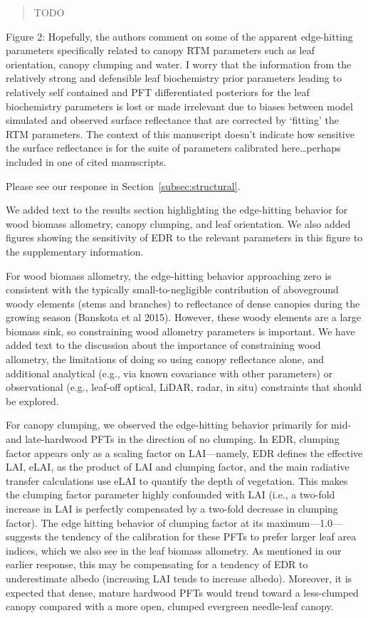 \begin{quote}
TODO
\end{quote}

\begin{reviewer}
  Figure 2: Hopefully, the authors comment on some of the apparent edge-hitting parameters specifically related to canopy RTM parameters such as leaf orientation, canopy clumping and water.
  I worry that the information from the relatively strong and defensible leaf biochemistry prior parameters leading to relatively self contained and PFT differentiated posteriors for the leaf biochemistry parameters is lost or made irrelevant due to biases between model simulated and observed surface reflectance that are corrected by ‘fitting’ the RTM parameters.
  The context of this manuscript doesn’t indicate how sensitive the surface reflectance is for the suite of parameters calibrated here\ldots perhaps included in one of cited manuscripts.
\end{reviewer}

Please see our response in Section~\ref{subsec:structural}.

We added text to the results section highlighting the edge-hitting behavior for wood biomass allometry, canopy clumping, and leaf orientation. We also added figures showing the sensitivity of EDR to the relevant parameters in this figure to the supplementary information.

For wood biomass allometry, the edge-hitting behavior approaching zero is consistent with the typically small-to-negligible contribution of aboveground woody elements (stems and branches) to reflectance of dense canopies during the growing season (Banskota et al 2015). However, these woody elements are a large biomass sink, so constraining wood allometry parameters is important. We have added text to the discussion about the importance of constraining wood allometry, the limitations of doing so using canopy reflectance alone, and additional analytical (e.g., via known covariance with other parameters) or observational (e.g., leaf-off optical, LiDAR, radar, in situ) constraints that should be explored.

For canopy clumping, we observed the edge-hitting behavior primarily for mid- and late-hardwood PFTs in the direction of no clumping. In EDR, clumping factor appears only as a scaling factor on LAI---namely, EDR defines the effective LAI, eLAI, as the product of LAI and clumping factor, and the main radiative transfer calculations use eLAI to quantify the depth of vegetation. This makes the clumping factor parameter highly confounded with LAI (i.e., a two-fold increase in LAI is perfectly compensated by a two-fold decrease in clumping factor). The edge hitting behavior of clumping factor at its maximum---1.0---suggests the tendency of the calibration for these PFTs to prefer larger leaf area indices, which we also see in the leaf biomass allometry. As mentioned in our earlier response, this may be compensating for a tendency of EDR to underestimate albedo (increasing LAI tends to increase albedo). Moreover, it is expected that dense, mature hardwood PFTs would trend toward a less-clumped canopy compared with a more open, clumped evergreen needle-leaf canopy.

